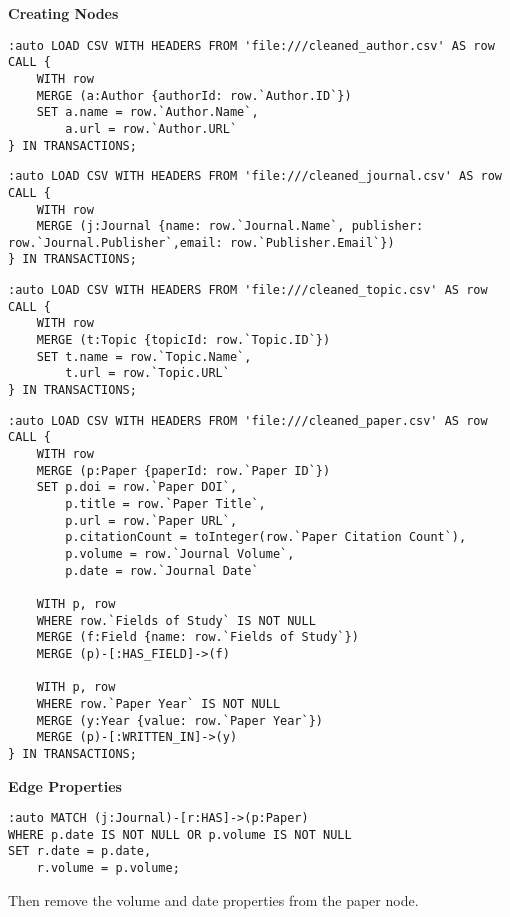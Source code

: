 \documentclass{article}
\theoremstyle{mytheoremstyle}
\theoremstyle{mytheoremstyle}
\theoremstyle{myproblemstyle}
\begin{document}
\textbf{Creating Nodes}

\begin{lstlisting}[style=cypherstyle]
:auto LOAD CSV WITH HEADERS FROM 'file:///cleaned_author.csv' AS row
CALL {
    WITH row
    MERGE (a:Author {authorId: row.`Author.ID`})
    SET a.name = row.`Author.Name`,
        a.url = row.`Author.URL`
} IN TRANSACTIONS;
\end{lstlisting}

\begin{lstlisting}[style=cypherstyle]
:auto LOAD CSV WITH HEADERS FROM 'file:///cleaned_journal.csv' AS row
CALL {
    WITH row
    MERGE (j:Journal {name: row.`Journal.Name`, publisher: row.`Journal.Publisher`,email: row.`Publisher.Email`})
} IN TRANSACTIONS;
\end{lstlisting}

\begin{lstlisting}[style=cypherstyle]
:auto LOAD CSV WITH HEADERS FROM 'file:///cleaned_topic.csv' AS row
CALL {
    WITH row
    MERGE (t:Topic {topicId: row.`Topic.ID`})
    SET t.name = row.`Topic.Name`,
        t.url = row.`Topic.URL`
} IN TRANSACTIONS;
\end{lstlisting}

\begin{lstlisting}[style=cypherstyle]
:auto LOAD CSV WITH HEADERS FROM 'file:///cleaned_paper.csv' AS row
CALL {
    WITH row
    MERGE (p:Paper {paperId: row.`Paper ID`})
    SET p.doi = row.`Paper DOI`,
        p.title = row.`Paper Title`,
        p.url = row.`Paper URL`,
        p.citationCount = toInteger(row.`Paper Citation Count`),
        p.volume = row.`Journal Volume`,
        p.date = row.`Journal Date`
    
    WITH p, row
    WHERE row.`Fields of Study` IS NOT NULL
    MERGE (f:Field {name: row.`Fields of Study`})
    MERGE (p)-[:HAS_FIELD]->(f)
    
    WITH p, row
    WHERE row.`Paper Year` IS NOT NULL
    MERGE (y:Year {value: row.`Paper Year`})
    MERGE (p)-[:WRITTEN_IN]->(y)
} IN TRANSACTIONS;
\end{lstlisting}

\textbf{Edge Properties}

\begin{lstlisting}[style=cypherstyle]
:auto MATCH (j:Journal)-[r:HAS]->(p:Paper)
WHERE p.date IS NOT NULL OR p.volume IS NOT NULL
SET r.date = p.date,
    r.volume = p.volume;
\end{lstlisting}

Then remove the volume and date properties from the paper node.
\end{document}

